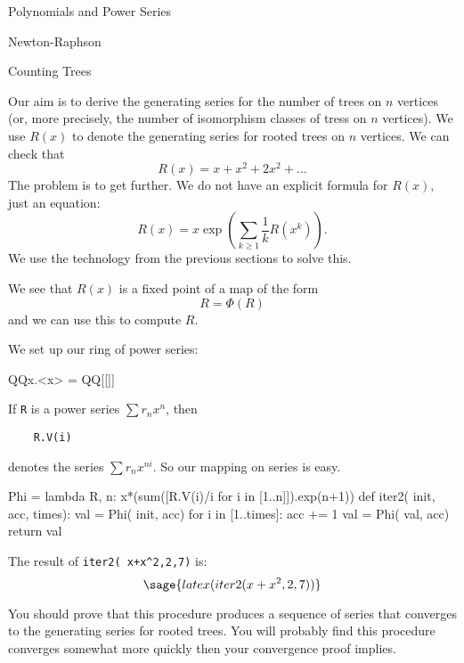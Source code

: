 \begin{chap}{Polynomials and Power Series}
\begin{sect}{Newton-Raphson}
\begin{para}
\end{para}
%
\end{sect}
%
\begin{sect}{Counting Trees}
%
\begin{para}
Our aim is to derive the generating series for the number of trees on
$n$ vertices (or, more precisely, the number of isomorphism classes of
tress on $n$ vertices). We use $R(x)$ to denote the generating series
for rooted trees on $n$ vertices. We can check that
\[
    R(x) = x+x^2+2x^2+\ldots
\]
The problem is to get further. We do not have an explicit formula for
$R(x)$, just an equation:
\[
    R(x) = x\exp\left(\sum_{k\ge1}\frac{1}{k}R(x^k)\right).
\]
We use the technology from the previous sections to solve this.

We see that $R(x)$ is a fixed point of a map of the form
\[
    R = \Phi(R)
\]
and we can use this to compute $R$.
\end{para}
%
\begin{para}
We set up our ring of power series:
\end{para}
%
\begin{sageblock}
    QQx.<x> = QQ[[]]
\end{sageblock}
%
\begin{para}
If \verb|R| is a power series $\sum r_n x^n$, then
\end{para}
%
\begin{verbatim}
    R.V(i)
\end{verbatim}
%
\begin{para}
denotes the series $\sum r_n x^{ni}$. So our mapping on series is easy.
\end{para}
%
\begin{sageblock}
 Phi = lambda R, n: x*(sum([R.V(i)/i for i in [1..n]]).exp(n+1))
 def iter2( init, acc, times):
     val = Phi( init, acc)
     for i in [1..times]:
         acc += 1
         val = Phi( val, acc)
     return val
\end{sageblock}
%
\begin{para}
The result of \verb|iter2( x+x^2,2,7)| is:
\[
    \sage{latex( iter2( x+x^2,2,7))}
\]
\end{para}
%
\begin{para}
You should prove that this procedure produces a sequence of
series that converges to the generating series for rooted trees.
You will probably find this procedure converges somewhat more
quickly then your convergence proof implies.
\end{para}
%
\begin{para}

\end{para}
\end{sect}
\end{chap}
